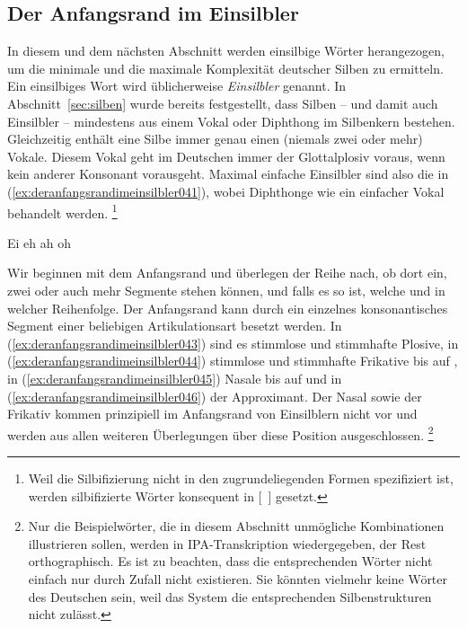 \subsection{Der Anfangsrand im Einsilbler}
\label{sec:deranfangsrandimeinsilbler}

In diesem und dem nächsten Abschnitt werden einsilbige Wörter herangezogen, um die minimale und die maximale Komplexität deutscher Silben zu ermitteln.
Ein einsilbiges Wort wird üblicherweise \textit{Einsilbler} genannt.
In Abschnitt~\ref{sec:silben} wurde bereits festgestellt, dass Silben -- und damit auch Einsilbler -- mindestens aus einem Vokal oder Diphthong im Silbenkern bestehen.
Gleichzeitig enthält eine Silbe immer genau einen (niemals zwei oder mehr) Vokale.
Diesem Vokal geht im Deutschen immer der Glottalplosiv voraus, wenn kein anderer Konsonant vorausgeht.
Maximal einfache Einsilbler sind also die in (\ref{ex:deranfangsrandimeinsilbler041}), wobei Diphthonge wie ein einfacher Vokal behandelt werden.%
\footnote{Weil die Silbifizierung nicht in den zugrundeliegenden Formen spezifiziert ist, werden silbifizierte Wörter konsequent in [~] gesetzt.}

\begin{exe}
  \ex\label{ex:deranfangsrandimeinsilbler041}
  \begin{xlist}
    \ex Ei \textipa{[P\t{aE}]}
    \ex eh \textipa{[Pe:]}
    \ex ah \textipa{[Pa:]}
    \ex oh \textipa{[Po:]}
  \end{xlist}
\end{exe}

Wir beginnen mit dem Anfangsrand und überlegen der Reihe nach, ob dort ein, zwei oder auch mehr Segmente stehen können, und falls es so ist, welche und in welcher Reihenfolge.
Der Anfangsrand kann durch ein einzelnes konsonantisches Segment einer beliebigen Artikulationsart besetzt werden.
In (\ref{ex:deranfangsrandimeinsilbler043}) sind es stimmlose und stimmhafte Plosive, in (\ref{ex:deranfangsrandimeinsilbler044}) stimmlose und stimmhafte Frikative bis auf \textipa{[\c{c}]}, in (\ref{ex:deranfangsrandimeinsilbler045}) Nasale bis auf \textipa{[N]} und in (\ref{ex:deranfangsrandimeinsilbler046}) der Approximant.
Der Nasal \textipa{[N]} sowie der Frikativ \textipa{[\c{c}]} kommen prinzipiell im Anfangsrand von Einsilblern nicht vor und werden aus allen weiteren Überlegungen über diese Position ausgeschlossen.%
\footnote{Nur die Beispielwörter, die in diesem Abschnitt unmögliche Kombinationen illustrieren sollen, werden in IPA-Transkription wiedergegeben, der Rest orthographisch.
Es ist zu beachten, dass die entsprechenden Wörter nicht einfach nur durch Zufall nicht existieren.
Sie könnten vielmehr keine Wörter des Deutschen sein, weil das System die entsprechenden Silbenstrukturen nicht zulässt.}

